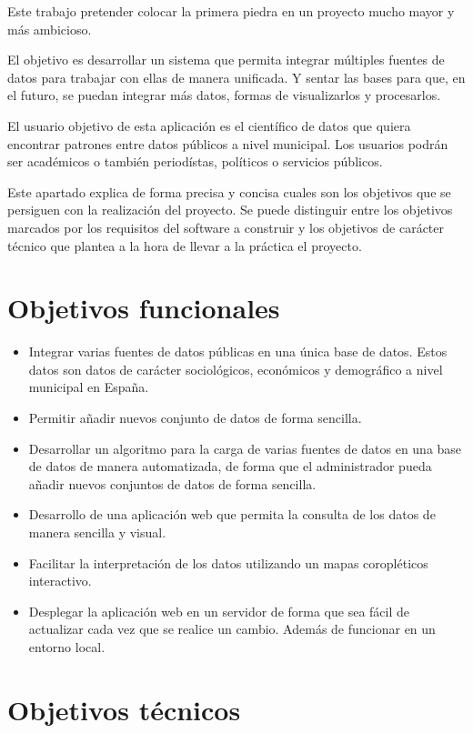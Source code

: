 
Este trabajo pretender colocar la primera piedra en un proyecto mucho mayor y más ambicioso.

El objetivo es desarrollar un sistema que permita integrar múltiples fuentes de datos para trabajar con ellas de manera unificada. Y sentar las bases para que, en el futuro, se puedan integrar más datos, formas de visualizarlos y procesarlos.

El usuario objetivo de esta aplicación es el científico de datos que quiera encontrar patrones entre datos públicos a nivel  municipal. Los usuarios podrán ser académicos o también periodístas, políticos o servicios públicos.

Este apartado explica de forma precisa y concisa cuales son los objetivos que se persiguen con la realización del proyecto. Se puede distinguir entre los objetivos marcados por los requisitos del software a construir y los objetivos de carácter técnico que plantea a la hora de llevar a la práctica el proyecto.

\section{Objetivos funcionales}

\begin{itemize}
	\item Integrar varias fuentes de datos públicas en una única base de datos. Estos datos son datos de carácter sociológicos, económicos y demográfico a nivel municipal en España.
	\item Permitir añadir nuevos conjunto de datos de forma sencilla.
	\item Desarrollar un algoritmo para la carga de varias fuentes de datos en una base de datos de manera automatizada, de forma que el administrador pueda añadir nuevos conjuntos de datos de forma sencilla.
	\item Desarrollo de una aplicación web que permita la consulta de los datos de manera sencilla y visual.
	\item Facilitar la interpretación de los datos utilizando un mapas coropléticos interactivo.
	\item Desplegar la aplicación web en un servidor de forma que sea fácil de actualizar cada vez que se realice un cambio. Además de funcionar en un entorno local.
\end{itemize}

\section{Objetivos técnicos}

